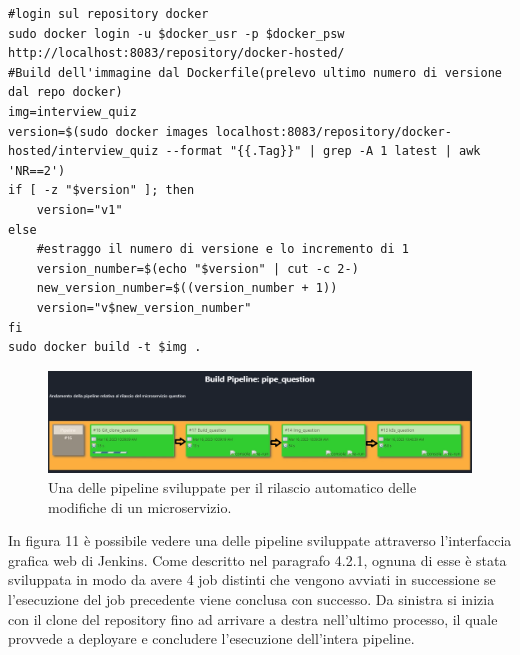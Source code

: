 \documentclass[a4paper,12pt]{report}
\begin{document}
\begin{lstlisting}[caption={\\\textit{Frammento di codice relativo al versionamento e alla build dell'immagine.}}]
#login sul repository docker
sudo docker login -u $docker_usr -p $docker_psw http://localhost:8083/repository/docker-hosted/
#Build dell'immagine dal Dockerfile(prelevo ultimo numero di versione dal repo docker)
img=interview_quiz
version=$(sudo docker images localhost:8083/repository/docker-hosted/interview_quiz --format "{{.Tag}}" | grep -A 1 latest | awk 'NR==2')
if [ -z "$version" ]; then
	version="v1"
else
    #estraggo il numero di versione e lo incremento di 1
    version_number=$(echo "$version" | cut -c 2-)
    new_version_number=$((version_number + 1))
    version="v$new_version_number"
fi
sudo docker build -t $img .
\end{lstlisting} 
\begin{figure}[h]
	\includegraphics[width=1.0\textwidth]{pipeline}
    \caption{Una delle pipeline sviluppate per il rilascio automatico delle modifiche di un microservizio.}
    \label{fig:pipeline}
\end{figure}

In figura 11 è possibile vedere una delle pipeline sviluppate attraverso l'interfaccia grafica web di Jenkins. Come descritto nel paragrafo 4.2.1, ognuna di esse è stata sviluppata in modo da avere 4 job distinti che vengono avviati in successione se l'esecuzione del job precedente viene conclusa con successo. Da sinistra si inizia con il clone del repository fino ad arrivare a destra nell'ultimo processo, il quale provvede a deployare e concludere l'esecuzione dell'intera pipeline.\\
\end{document}
